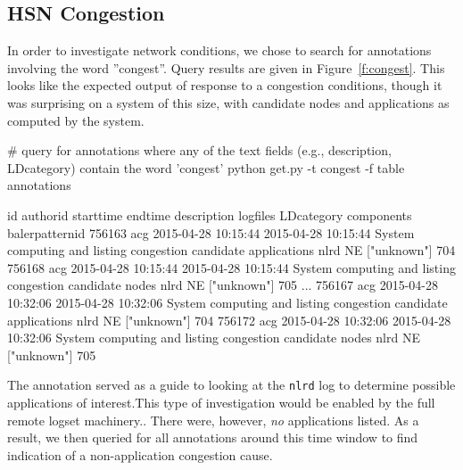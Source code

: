 \subsection{HSN Congestion}
\label{s:congestion}

In order to investigate network conditions, we chose to search for annotations involving the
word ''congest''. Query results are given in Figure~\ref{f:congest}. This looks like the
expected output of response to a congestion conditions, though it was surprising
on a system of this size, with candidate nodes and applications
as computed by the system.

\begin{figure*}
\begin{annol}
# query for annotations where any of the text fields (e.g., description, LDcategory) contain the word 'congest'
python get.py  -t congest -f table annotations

id	authorid	starttime	endtime		description	logfiles	LDcategory	components	balerpatternid
756163	acg	2015-04-28 10:15:44	2015-04-28 10:15:44	System computing and listing congestion candidate applications		nlrd	NE	["unknown"]	704
756168	acg	2015-04-28 10:15:44	2015-04-28 10:15:44	System computing and listing congestion candidate nodes		nlrd	NE	["unknown"]	705
...
756167	acg	2015-04-28 10:32:06	2015-04-28 10:32:06	System computing and listing congestion candidate applications		nlrd	NE	["unknown"]	704
756172	acg	2015-04-28 10:32:06	2015-04-28 10:32:06	System computing and listing congestion candidate nodes		nlrd	NE	["unknown"]	705
\end{annol}
\caption{Congestion response annotations occur 5 times within 15 minutes. The annotation regarding
candidate applications drove investigation of the \texttt{nlrd} log file, but no applications
were listed.}
\label{f:congest}
\end{figure*}

The annotation served as a guide to looking at the \texttt{nlrd} log to determine possible
applications of interest.This type of investigation would be enabled by the
full remote logset machinery..
There were, however, \emph{no} applications listed.
As a result, we then queried for all annotations around this time window to find indication
of a non-application congestion cause.

